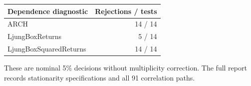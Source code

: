 \par\medskip\noindent
\begin{tabular}{@{}lr@{}}
\toprule
Dependence diagnostic & Rejections / tests\\
\midrule
ARCH & 14 / 14\\
LjungBoxReturns & 5 / 14\\
LjungBoxSquaredReturns & 14 / 14\\
\bottomrule
\end{tabular}
\par\medskip
\par\medskip\small These are nominal 5\% decisions without multiplicity correction. The full report records stationarity specifications and all 91 correlation paths.
